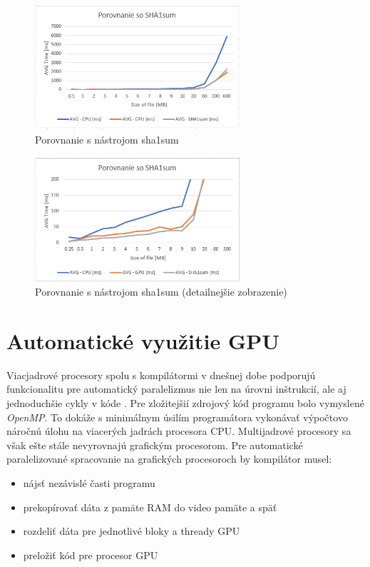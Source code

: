 \documentclass[conference]{IEEEtran}
\begin{document}
\begin{figure}[h!]
\centering
\includegraphics[width=3in]{img/sha1sum}
\caption{Porovnanie s nástrojom sha1sum}
\end{figure}

\begin{figure}[h!]
\centering
\includegraphics[width=3in]{img/sha1sumdetail}
\caption{Porovnanie s nástrojom sha1sum  (detailnejšie zobrazenie)}
\end{figure}


\section{Automatické využitie GPU}

Viacjadrové procesory spolu s kompilátormi v dnešnej dobe podporujú funkcionalitu pre automatický paralelizmus nie len na úrovni inštrukcií, ale aj jednoduchšie cykly v kóde \cite{automatic}. Pre zložitejšií zdrojový kód programu bolo vymyslené \textit{OpenMP}. To dokáže s minimálnym úsilím programátora vykonávať výpočtovo náročnú úlohu na viacerých jadrách procesora CPU.
Multijadrové procesory sa však ešte stále nevyrovnajú grafickým procesorom. Pre automatické paralelizované spracovanie na grafických procesoroch by kompilátor musel:

\begin{itemize}
	\item{nájsť nezávislé časti programu}
	\item{prekopírovať dáta z pamäte RAM do video pamäte a späť}
	\item{rozdeliť dáta pre jednotlivé bloky a thready GPU}
	\item{preložiť kód pre procesor GPU}
\end{itemize}
\end{document}
